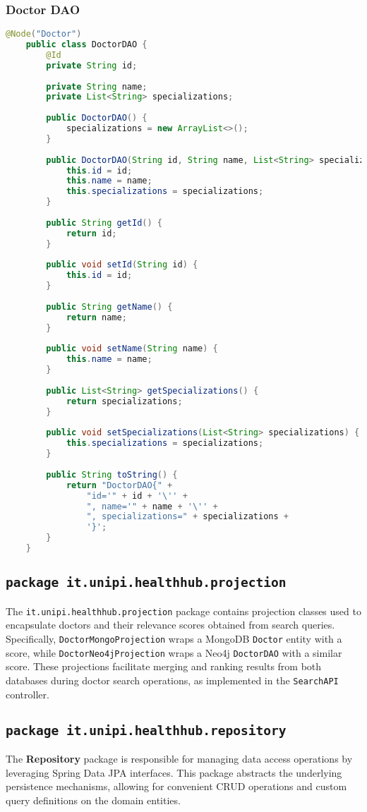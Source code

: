\subsubsection{Doctor DAO}
\begin{lstlisting}[language=java]
	@Node("Doctor")
	public class DoctorDAO {
		@Id
		private String id;
		
		private String name;
		private List<String> specializations;
		
		public DoctorDAO() {
			specializations = new ArrayList<>();
		}
		
		public DoctorDAO(String id, String name, List<String> specializations) {
			this.id = id;
			this.name = name;
			this.specializations = specializations;
		}
		
		public String getId() {
			return id;
		}
		
		public void setId(String id) {
			this.id = id;
		}
		
		public String getName() {
			return name;
		}
		
		public void setName(String name) {
			this.name = name;
		}
		
		public List<String> getSpecializations() {
			return specializations;
		}
		
		public void setSpecializations(List<String> specializations) {
			this.specializations = specializations;
		}
		
		public String toString() {
			return "DoctorDAO{" +
				"id='" + id + '\'' +
				", name='" + name + '\'' +
				", specializations=" + specializations +
				'}';
		}
	}
\end{lstlisting}

\subsection{\texttt{package it.unipi.healthhub.projection}}
The \texttt{it.unipi.healthhub.projection} package contains projection classes used to encapsulate doctors and their relevance scores obtained from search queries. Specifically, \texttt{DoctorMongoProjection} wraps a MongoDB \texttt{Doctor} entity with a score, while \texttt{DoctorNeo4jProjection} wraps a Neo4j \texttt{DoctorDAO} with a similar score. These projections facilitate merging and ranking results from both databases during doctor search operations, as implemented in the \texttt{SearchAPI} controller.

\subsection{\texttt{package it.unipi.healthhub.repository}}
The \textbf{Repository} package is responsible for managing data access operations by leveraging Spring Data JPA interfaces. This package abstracts the underlying persistence mechanisms, allowing for convenient CRUD operations and custom query definitions on the domain entities. 

